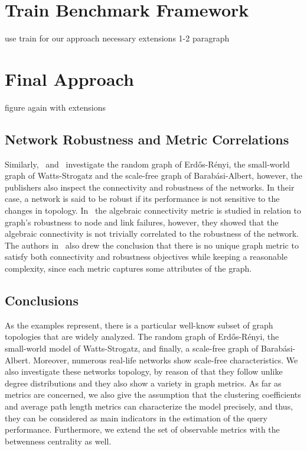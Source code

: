 \section{Train Benchmark Framework}
use train for our approach
necessary extensions
1-2 paragraph
\section{Final Approach}

figure again with extensions


\subsection{Network Robustness and Metric Correlations}\label{sec:algebraic_connectivity}

Similarly,~\cite{algebraic1} and~\cite{algebraic2} investigate the random graph of Erdős-Rényi, the small-world graph of Watts-Strogatz and the scale-free graph of Barabási-Albert, however, the publishers also inspect the connectivity and robustness of the networks. In their case, a network is said to be robust if its performance is not sensitive to the changes in topology. In~\cite{algebraic1} the algebraic connectivity metric is studied in relation to graph’s robustness to node and link failures, however, they showed that the algebraic connectivity is not trivially correlated to the robustness of the network. The authors in~\cite{algebraic2} also drew the conclusion that there is no unique graph metric to satisfy both connectivity and robustness objectives while keeping a reasonable complexity, since each metric captures some attributes of the graph.



\subsection{Conclusions}

As the examples represent, there is a particular well-know subset of graph topologies that are widely analyzed. The random graph of Erdős-Rényi, the small-world model of Watts-Strogatz, and finally, a scale-free graph of Barabási-Albert. Moreover, numerous real-life networks show scale-free characteristics. We also investigate these networks topology, by reason of that they follow unlike degree distributions and they also show a variety in graph metrics. As far as metrics are concerned, we also give the assumption that the clustering coefficients and average path length metrics can characterize the model precisely, and thus, they can be considered as main indicators in the estimation of the query performance. Furthermore, we extend the set of observable metrics with the betwenness centrality as well.

